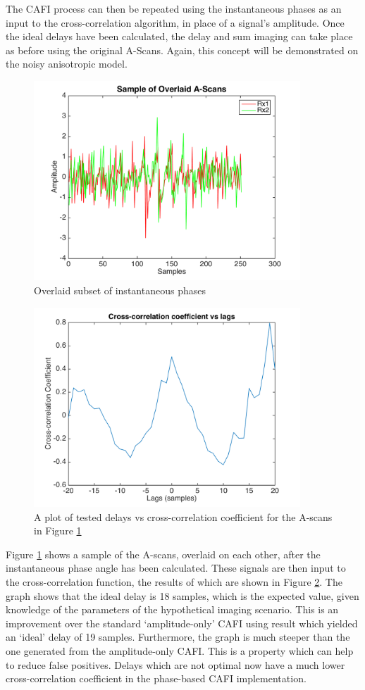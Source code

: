 The CAFI process can then be repeated using the instantaneous phases as an input to the cross-correlation algorithm, in place of a signal's amplitude. Once the ideal delays have been calculated, the delay and sum imaging can take place as before using the original A-Scans. Again, this concept will be demonstrated on the noisy anisotropic model.

\begin{figure}[hp]
\centering
		\includegraphics[width=100mm]{Noise_5_Phase.png}
		\caption{Overlaid subset of instantaneous phases}
		\label{fig:cafi_phase5}
\end{figure}

\begin{figure}[hp]
\centering
		\includegraphics[width=100mm]{Noise_10_Phase.png}
		\caption{A plot of tested delays vs cross-correlation coefficient for the A-scans in Figure \ref{fig:cafi_phase5}}
		\label{fig:cafi_phase10}
\end{figure}

Figure \ref{fig:cafi_phase5} shows a sample of the A-scans, overlaid on each other, after the instantaneous phase angle has been calculated. These signals are then input to the cross-correlation function, the results of which are shown in Figure \ref{fig:cafi_phase10}. The graph shows that the ideal delay is 18 samples, which is the expected value, given knowledge of the parameters of the hypothetical imaging scenario. This is an improvement over the standard `amplitude-only' CAFI using result which yielded an `ideal' delay of 19 samples. Furthermore, the graph is much steeper than the one generated from the amplitude-only CAFI. This is a property which can help to reduce false positives. Delays which are not optimal now have a much lower cross-correlation coefficient in the phase-based CAFI implementation. 

